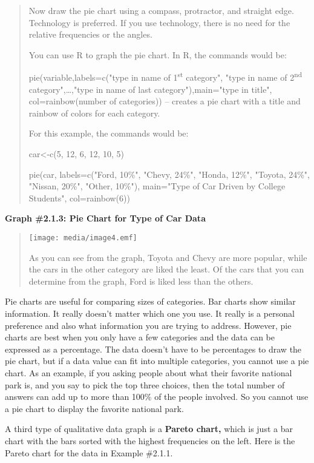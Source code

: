 \documentclass[]{book}
\begin{document}
\begin{quote}
Now draw the pie chart using a compass, protractor, and straight edge.
Technology is preferred. If you use technology, there is no need for
the relative frequencies or the angles.

You can use R to graph the pie chart. In R, the commands would be:

pie(variable,labels=c("type in name of 1\textsuperscript{st} category", "type in
name of 2\textsuperscript{nd} category",\ldots{},"type in name of last
category"),main="type in title", col=rainbow(number of categories))
-- creates a pie chart with a title and rainbow of colors for each
category.

For this example, the commands would be:

car\textless{}-c(5, 12, 6, 12, 10, 5)

pie(car, labels=c("Ford, 10\%", "Chevy, 24\%", "Honda, 12\%",
"Toyota, 24\%", "Nissan, 20\%", "Other, 10\%"), main="Type of Car
Driven by College Students", col=rainbow(6))
\end{quote}

\textbf{Graph \#2.1.3: Pie Chart for Type of Car Data}

\begin{quote}
\texttt{[image: media/image4.emf]}

As you can see from the graph, Toyota and Chevy are more popular,
while the cars in the other category are liked the least. Of the cars
that you can determine from the graph, Ford is liked less than the
others.
\end{quote}

Pie charts are useful for comparing sizes of categories. Bar charts show
similar information. It really doesn't matter which one you use. It
really is a personal preference and also what information you are trying
to address. However, pie charts are best when you only have a few
categories and the data can be expressed as a percentage. The data
doesn't have to be percentages to draw the pie chart, but if a data
value can fit into multiple categories, you cannot use a pie chart. As
an example, if you asking people about what their favorite national park
is, and you say to pick the top three choices, then the total number of
answers can add up to more than 100\% of the people involved. So you
cannot use a pie chart to display the favorite national park.

A third type of qualitative data graph is a \textbf{Pareto chart,} which is
just a bar chart with the bars sorted with the highest frequencies on
the left. Here is the Pareto chart for the data in Example \#2.1.1.
\end{document}
